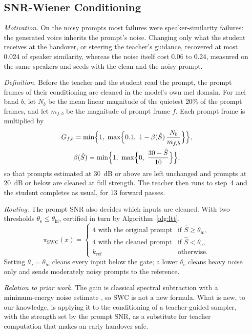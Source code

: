 \subsection{SNR-Wiener Conditioning}
\label{app:cand-swc}

\emph{Motivation.} On the noisy prompts most failures were speaker-similarity failures: the generated voice inherits the prompt's noise. Changing only what the student receives at the handover, or steering the teacher's guidance, recovered at most 0.024 of speaker similarity, whereas the noise itself cost 0.06 to 0.24, measured on the same speakers and seeds with the clean and the noisy prompt.

\emph{Definition.} Before the teacher and the student read the prompt, the prompt frames of their conditioning are cleaned in the model's own mel domain. For mel band $b$, let $N_b$ be the mean linear magnitude of the quietest 20\% of the prompt frames, and let $m_{f,b}$ be the magnitude of prompt frame $f$. Each prompt frame is multiplied by
\begin{gather*}
G_{f,b}=\min\Bigl\{1,\ \max\Bigl\{0.1,\ 1-\beta(\hat S)\,\frac{N_b}{m_{f,b}}\Bigr\}\Bigr\},\\
\beta(\hat S)=\min\Bigl\{1,\ \max\Bigl\{0,\ \frac{30-\hat S}{10}\Bigr\}\Bigr\},
\end{gather*}
so that prompts estimated at 30~dB or above are left unchanged and prompts at 20~dB or below are cleaned at full strength. The teacher then runs to step~4 and the student completes as usual, for 13 forward passes.

\emph{Routing.} The prompt SNR also decides which inputs are cleaned. With two thresholds $\theta_{\mathrm{e}}\le\theta_{\mathrm{hi}}$, certified in turn by Algorithm~\ref{alg:ltt},
\[
\pi_{\mathrm{SWC}}(x)=\begin{cases}4 \text{ with the original prompt} & \text{if } \hat S\ge\theta_{\mathrm{hi}},\\[2pt] 4 \text{ with the cleaned prompt} & \text{if } \hat S<\theta_{\mathrm{e}},\\[2pt] k_{\text{ref}} & \text{otherwise.}\end{cases}
\]
Setting $\theta_{\mathrm{e}}=\theta_{\mathrm{hi}}$ cleans every input below the gate; a lower $\theta_{\mathrm{e}}$ cleans heavy noise only and sends moderately noisy prompts to the reference.

\emph{Relation to prior work.} The gain is classical spectral subtraction with a minimum-energy noise estimate \parencite{boll1979spectral}, so SWC is not a new formula. What is new, to our knowledge, is applying it to the conditioning of a teacher-guided sampler, with the strength set by the prompt SNR, as a substitute for teacher computation that makes an early handover safe.

